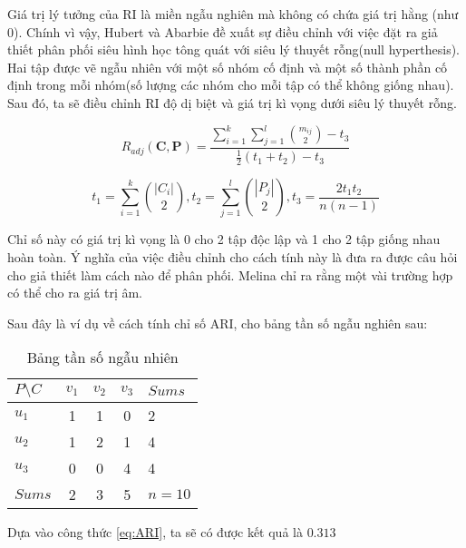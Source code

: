 Giá trị lý tưởng của RI là miền ngẫu nghiên mà không có chứa giá trị hằng (như $0$).
Chính vì vậy, Hubert và Abarbie đề xuất sự điều chỉnh với việc đặt ra giả thiết phân phối siêu hình học tông quát với siêu lý thuyết rỗng(null hyperthesis).
Hai tập được vẽ ngẫu nhiên với một số nhóm cố định và một số thành phần cố định trong mỗi nhóm(số lượng các nhóm cho mỗi tập có thể không giống nhau).
Sau đó, ta sẽ điều chỉnh RI độ dị biệt và giá trị kì vọng dưới siêu lý thuyết rỗng.
\begin{center}
\begin{equation} \label{eq:ARI}
R_{adj}(\textbf{C}, \textbf{P}) = \frac{\sum^k_{i=1} \sum^l_{j=1} \binom {m_{ij}}  {2} - t_3}{\frac{1}{2} (t_1 + t_2) - t_3}
\end{equation}

\begin{equation} \label{eq:ARIParts}
t_1 = \sum^k_{i=1} \binom {|C_i|} {2} , t_2 = \sum_{j=1}^l \binom {|P_j|} {2}, t_3 = \frac{2 t_1 t_2}{n (n - 1)}
\end{equation}
\end{center}

Chỉ số này có giá trị kì vọng là 0 cho 2 tập độc lập và 1 cho 2 tập giống nhau hoàn toàn.
Ý nghĩa của việc điều chỉnh cho cách tính này là đưa ra được câu hỏi cho giả thiết làm cách nào để phân phối.
Melina chỉ ra rằng một vài trường hợp có thể cho ra giá trị âm.

Sau đây là ví dụ về cách tính chỉ số ARI, cho bảng tần số ngẫu nghiên sau:
\begin{table}[ht]
\begin{center}
\begin{tabular}{l|c c c|l}
\hline
$P \setminus C$ & $v_1$ & $v_2$ & $v_3$ & $Sums$ \\
\hline
$u_1$ & 1 & 1 & 0 & 2 \\
$u_2$ & 1 & 2 & 1 & 4 \\
$u_3$ & 0 & 0 & 4 & 4 \\
\hline
$Sums$ & 2 & 3 & 5 & $n = 10$ \\
\end{tabular}
\caption[Bảng tần số ngẫu nhiên]{Bảng tần số ngẫu nhiên}
\label{bang_4_5}
\end{center}
\end{table}

Dựa vào công thức \ref{eq:ARI}, ta sẽ có được kết quả là $0.313$

